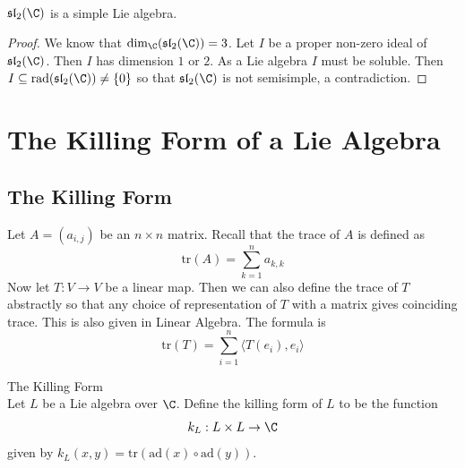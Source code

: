 \documentclass[a4paper]{article}
\begin{document}
\begin{eg}{}{} \\$\mathfrak{sl}_2(\C)$ is a simple Lie algebra. 
\begin{proof}
We know that $\dim_\C(\mathfrak{sl}_2(\C))=3$. Let $I$ be a proper non-zero ideal of $\mathfrak{sl}_2(\C)$. Then $I$ has dimension $1$ or $2$. As a Lie algebra $I$ must be soluble. Then $I\subseteq\text{rad}(\mathfrak{sl}_2(\C))\neq\{0\}$ so that $\mathfrak{sl}_2(\C)$ is not semisimple, a contradiction. 
\end{proof}
\end{eg}

\pagebreak
\section{The Killing Form of a Lie Algebra}
\subsection{The Killing Form}
Let $A=(a_{i,j})$ be an $n\times n$ matrix. Recall that the trace of $A$ is defined as $$\text{tr}(A)=\sum_{k=1}^na_{k,k}$$ Now let $T:V\to V$ be a linear map. Then we can also define the trace of $T$ abstractly so that any choice of representation of $T$ with a matrix gives coinciding trace. This is also given in Linear Algebra. The formula is $$\text{tr}(T)=\sum_{i=1}^n\langle T(e_i),e_i\rangle$$

\begin{defn}{The Killing Form}{} \\Let $L$ be a Lie algebra over $\C$. Define the killing form of $L$ to be the function $$k_L:L\times L\to\C$$ given by $k_L(x,y)=\text{tr}(\text{ad}(x)\circ\text{ad}(y))$. 
\end{defn}
\end{document}
